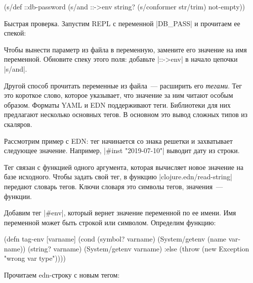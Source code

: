\begin{english}
  \begin{clojure}
(s/def ::db-password
  (s/and ::->env
         string?
         (s/conformer str/trim)
         not-empty))
  \end{clojure}
\end{english}

Быстрая проверка. Запустим REPL с переменной \spverb|DB_PASS| и
прочитаем ее спекой:

\begin{english}
  \begin{bash}
DB_PASS='*(&fd}A53z#$!' lein repl

(s/conform ::db-password "DB_PASS")
"*(&fd}A53z#$!"
  \end{bash}
\end{english}

Чтобы вынести параметр из файла в переменную, замените его значение на имя
переменной. Обновите спеку этого поля: добавьте \spverb|::->env| в начало
цепочки \spverb|s/and|.

Другой способ прочитать переменные из файла~--- расширить его \emph{тегами}. Тег
это короткое слово, которое указывает, что значение за ним читают особым
образом. Форматы YAML и EDN поддерживают теги. Библиотеки для них предлагают
несколько основных тегов. В основном это вывод сложных типов из скаляров.

Рассмотрим пример с EDN: тег начинается со знака решетки и захватывает следующее
значение. Например, \spverb|#inst "2019-07-10"| выводит дату из строки.

Тег связан с функцией одного аргумента, которая вычисляет новое значение на базе
исходного. Чтобы задать свой тег, в функцию \spverb|clojure.edn/read-string|
передают словарь тегов. Ключи словаря это символы тегов, значения~--- функции.

Добавим тег \spverb|#env|, который вернет значение переменной по ее имени. Имя
переменной может быть строкой или символом. Определим функцию:

\begin{english}
  \begin{clojure}
(defn tag-env
  [varname]
  (cond
    (symbol? varname)
    (System/getenv (name varname))
    (string? varname)
    (System/getenv varname)
    :else
    (throw (new Exception "wrong var type"))))
  \end{clojure}
\end{english}

\noindent
Прочитаем edn-строку с новым тегом:

